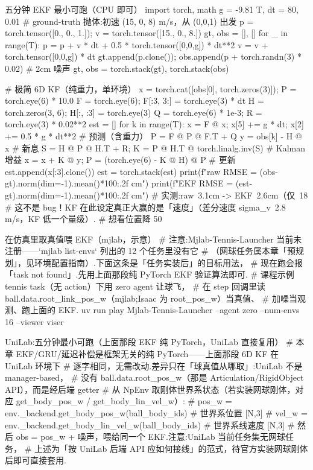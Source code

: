 \begin{codebox}[Python]{五分钟 EKF 最小可跑（CPU 即可）}
import torch, math
g = -9.81
T, dt = 80, 0.01
# ground-truth 抛体:初速 (15, 0, 8) m/s，从 (0,0,1) 出发
p = torch.tensor([0., 0., 1.]); v = torch.tensor([15., 0., 8.])
gt, obs = [], []
for _ in range(T):
    p = p + v * dt + 0.5 * torch.tensor([0,0,g]) * dt**2
    v = v + torch.tensor([0,0,g]) * dt
    gt.append(p.clone()); obs.append(p + torch.randn(3) * 0.02)   # 2cm 噪声
gt, obs = torch.stack(gt), torch.stack(obs)

# 极简 6D KF（纯重力，单环境）
x = torch.cat([obs[0], torch.zeros(3)]); P = torch.eye(6) * 10.0
F = torch.eye(6); F[:3, 3:] = torch.eye(3) * dt
H = torch.zeros(3, 6); H[:, :3] = torch.eye(3)
Q = torch.eye(6) * 1e-3; R = torch.eye(3) * 0.02**2
est = []
for k in range(T):
    x = F @ x; x[5] += g * dt; x[2] += 0.5 * g * dt**2     # 预测（含重力）
    P = F @ P @ F.T + Q
    y = obs[k] - H @ x                                       # 新息
    S = H @ P @ H.T + R; K = P @ H.T @ torch.linalg.inv(S)  # Kalman 增益
    x = x + K @ y; P = (torch.eye(6) - K @ H) @ P            # 更新
    est.append(x[:3].clone())
est = torch.stack(est)
print(f"raw  RMSE = {(obs-gt).norm(dim=-1).mean()*100:.2f} cm")
print(f"EKF  RMSE = {(est-gt).norm(dim=-1).mean()*100:.2f} cm")
# 实测:raw~3.1cm -> EKF~2.6cm（仅~18%
# 这不是 bug！KF 在此设定真正大赢的是「速度」（差分速度 sigma_v~2.8 m/s，KF 低一个量级）.
# 想看位置降 50%
\end{codebox}

\begin{codebox}[bash]{在仿真里取真值喂 EKF（mjlab，示意）}
# 注意:Mjlab-Tennis-Launcher 当前未注册——`mjlab list-envs` 列出的 12 个任务里没有它
# （网球任务属本章「预规划」，见环境配置指南）.下面这条是「任务实装后」的目标用法，
# 现在跑会报「task not found」.先用上面那段纯 PyTorch EKF 验证算法即可.
# 课程示例 tennis task（无 action）下用 zero agent 让球飞，
# 在 step 回调里读 ball.data.root_link_pos_w（mjlab;Isaac 为 root_pos_w）当真值、
# 加噪当观测、跑上面的 EKF.
uv run play Mjlab-Tennis-Launcher --agent zero --num-envs 16 --viewer viser
\end{codebox}

\begin{codebox}[Python]{UniLab:五分钟最小可跑（上面那段 EKF 纯 PyTorch，UniLab 直接复用）}
# 本章 EKF/GRU/延迟补偿是框架无关的纯 PyTorch——上面那段 6D KF 在 UniLab 环境下
# 逐字相同，无需改动.差异只在「球真值从哪取」:UniLab 不是 manager-based，
# 没有 ball.data.root_pos_w（那是 Articulation/RigidObject API），而是经后端 getter
# 从 NpEnv 取刚体世界系状态（若实装网球刚体，对应 get_body_pos_w / get_body_lin_vel_w）:
#   pos_w = env._backend.get_body_pos_w(ball_body_ids)      # 世界系位置 [N,3]
#   vel_w = env._backend.get_body_lin_vel_w(ball_body_ids)  # 世界系线速度 [N,3]
# 然后 obs = pos_w + 噪声，喂给同一个 EKF.注意:UniLab 当前任务集无网球任务，
# 上述为「按 UniLab 后端 API 应如何接线」的范式，待官方实装网球刚体后即可直接套用.
\end{codebox}

